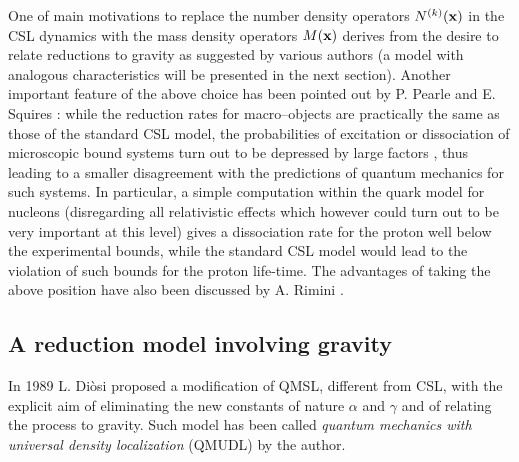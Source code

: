 \documentclass[12pt]{article}
\begin{document}
One of main motivations to replace the number density operators
$N^{(k)}({\bf x})$ in the CSL dynamics with the mass density
operators $M({\bf x})$ derives from the desire to relate
reductions to gravity as suggested by various authors
\cite{kar,kom,pen1,emn,di2,fre} (a model with analogous
characteristics will be presented in the next section). Another
important feature of the above choice has been pointed out by P.
Pearle and E. Squires \cite{pes}: while the reduction rates for
macro--objects are practically the same as those of the standard
CSL model, the probabilities of excitation or dissociation of
microscopic bound systems turn out to be depressed by large
factors \cite{pes,bggg}, thus leading to a smaller disagreement
with the predictions of quantum mechanics for such systems. In
particular, a simple computation within the quark model for
nucleons (disregarding all relativistic effects which however
could turn out to be very important at this level) gives a
dissociation rate for the proton well below the experimental
bounds, while  the standard CSL model would lead to the violation of
such  bounds for the proton life-time. The advantages of taking the above
position have also been discussed by A. Rimini \cite{rimg}.


\subsection{A reduction model involving gravity} \label{sec8}

In 1989 L. Di\`osi \cite{di2} proposed a modification of QMSL,
different from CSL, with the explicit aim of eliminating the new
constants of nature $\alpha$ and $\gamma$ and of relating the
process to gravity. Such model has been called {\it quantum
mechanics with universal density localization} (QMUDL) by the
author.
\end{document}
